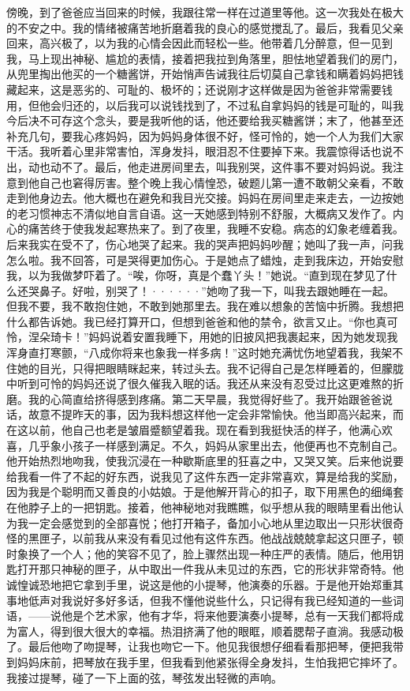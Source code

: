\documentclass[12pt, UTF8]{ctexbook}
\begin{document}
\par 傍晚，到了爸爸应当回来的时候，我跟往常一样在过道里等他。这一次我处在极大的不安之中。我的情绪被痛苦地折磨着我的良心的感觉搅乱了。最后，我看见父亲回来，高兴极了，以为我的心情会因此而轻松一些。他带着几分醉意，但一见到我，马上现出神秘、尴尬的表情，接着把我拉到角落里，胆怯地望着我们的房门，从兜里掏出他买的一个糖酱饼，开始悄声告诫我往后切莫自己拿钱和瞒着妈妈把钱藏起来，这是恶劣的、可耻的、极坏的；还说刚才这样做是因为爸爸非常需要钱用，但他会归还的，以后我可以说钱找到了，不过私自拿妈妈的钱是可耻的，叫我今后决不可存这个念头，要是我听他的话，他还要给我买糖酱饼；末了，他甚至还补充几句，要我心疼妈妈，因为妈妈身体很不好，怪可怜的，她一个人为我们大家干活。我听着心里非常害怕，浑身发抖，眼泪忍不住要掉下来。我震惊得话也说不出，动也动不了。最后，他走进房间里去，叫我别哭，这件事不要对妈妈说。我注意到他自己也窘得厉害。整个晚上我心情惶恐，破题儿第一遭不敢朝父亲看，不敢走到他身边去。他大概也在避免和我目光交接。妈妈在房间里走来走去，一边按她的老习惯神志不清似地自言自语。这一天她感到特别不舒服，大概病又发作了。内心的痛苦终于使我发起寒热来了。到了夜里，我睡不安稳。病态的幻象老缠着我。后来我实在受不了，伤心地哭了起来。我的哭声把妈妈吵醒；她叫了我一声，问我怎么啦。我不回答，可是哭得更加伤心。于是她点了蜡烛，走到我床边，开始安慰我，以为我做梦吓着了。“唉，你呀，真是个蠢丫头！”她说。“直到现在梦见了什么还哭鼻子。好啦，别哭了！······”她吻了我一下，叫我去跟她睡在一起。但我不要，我不敢抱住她，不敢到她那里去。我在难以想象的苦恼中折腾。我想把什么都告诉她。我已经打算开口，但想到爸爸和他的禁令，欲言又止。“你也真可怜，涅朵琦卡！”妈妈说着安置我睡下，用她的旧披风把我裹起来，因为她发现我浑身直打寒颤，“八成你将来也象我一样多病！”这时她充满忧伤地望着我，我架不住她的目光，只得把眼睛眯起来，转过头去。我不记得自己是怎样睡着的，但朦胧中听到可怜的妈妈还说了很久催我入眠的话。我还从来没有忍受过比这更难熬的折磨。我的心简直给挤得感到疼痛。第二天早晨，我觉得好些了。我开始跟爸爸说话，故意不提昨天的事，因为我料想这样他一定会非常愉快。他当即高兴起来，而在这以前，他自己也老是皱眉蹙额望着我。现在看到我挺快活的样子，他满心欢喜，几乎象小孩子一样感到满足。不久，妈妈从家里出去，他便再也不克制自己。他开始热烈地吻我，使我沉浸在一种歇斯底里的狂喜之中，又哭又笑。后来他说要给我看一件了不起的好东西，说我见了这件东西一定非常喜欢，算是给我的奖励，因为我是个聪明而又善良的小姑娘。于是他解开背心的扣子，取下用黑色的细绳套在他脖子上的一把钥匙。接着，他神秘地对我瞧瞧，似乎想从我的眼睛里看出他认为我一定会感觉到的全部喜悦；他打开箱子，备加小心地从里边取出一只形状很奇怪的黑匣子，以前我从来没有看见过他有这件东西。他战战兢兢拿起这只匣子，顿时象换了一个人；他的笑容不见了，脸上骤然出现一种庄严的表情。随后，他用钥匙打开那只神秘的匣子，从中取出一件我从未见过的东西，它的形状非常奇特。他诚惶诚恐地把它拿到手里，说这是他的小提琴，他演奏的乐器。于是他开始郑重其事地低声对我说好多好多话，但我不懂他说些什么，只记得有我已经知道的一些词语，——说他是个艺术家，他有才华，将来他要演奏小提琴，总有一天我们都将成为富人，得到很大很大的幸福。热泪挤满了他的眼眶，顺着腮帮子直淌。我感动极了。最后他吻了吻提琴，让我也吻它一下。他见我很想仔细看看那把琴，便把我带到妈妈床前，把琴放在我手里，但我看到他紧张得全身发抖，生怕我把它摔坏了。我接过提琴，碰了一下上面的弦，琴弦发出轻微的声响。
\end{document}
